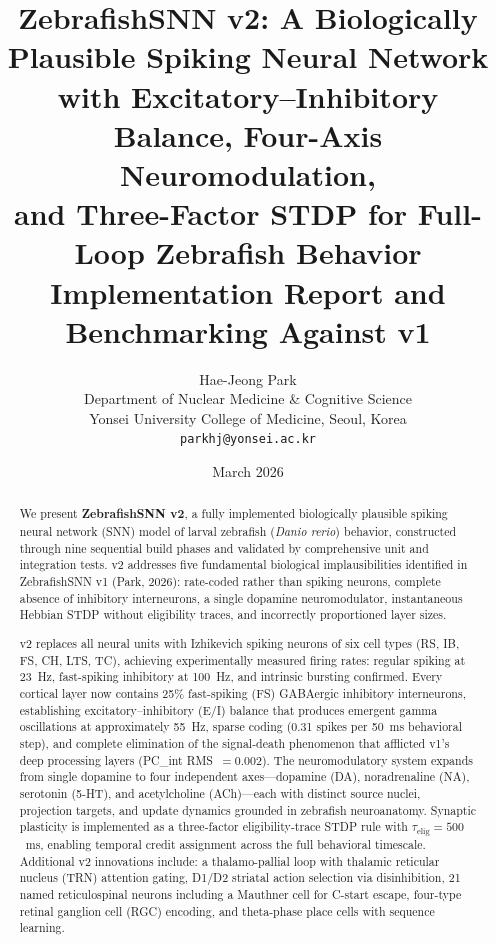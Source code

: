 \documentclass[11pt,a4paper]{article}
\title{%
  \textbf{ZebrafishSNN v2: A Biologically Plausible Spiking Neural Network\\
  with Excitatory--Inhibitory Balance, Four-Axis Neuromodulation,\\
  and Three-Factor STDP for Full-Loop Zebrafish Behavior}\\[10pt]
  \large Implementation Report and Benchmarking Against v1
}
\author{%
  Hae-Jeong Park\\[4pt]
  Department of Nuclear Medicine \& Cognitive Science\\
  Yonsei University College of Medicine, Seoul, Korea\\
  \texttt{parkhj@yonsei.ac.kr}
}
\date{March 2026}
\begin{document}
\maketitle

\begin{abstract}

We present \textbf{ZebrafishSNN v2}, a fully implemented biologically plausible
spiking neural network (SNN) model of larval zebrafish (\textit{Danio rerio})
behavior, constructed through nine sequential build phases and validated by
comprehensive unit and integration tests.
v2 addresses five fundamental biological implausibilities identified in
ZebrafishSNN v1 (Park, 2026): rate-coded rather than spiking neurons,
complete absence of inhibitory interneurons, a single dopamine neuromodulator,
instantaneous Hebbian STDP without eligibility traces, and incorrectly
proportioned layer sizes.

v2 replaces all neural units with Izhikevich spiking neurons of six
cell types (RS, IB, FS, CH, LTS, TC), achieving experimentally measured
firing rates: regular spiking at 23~Hz, fast-spiking inhibitory at 100~Hz,
and intrinsic bursting confirmed.
Every cortical layer now contains 25\% fast-spiking (FS) GABAergic
inhibitory interneurons, establishing excitatory--inhibitory (E/I) balance
that produces emergent gamma oscillations at approximately 55~Hz,
sparse coding (0.31 spikes per 50~ms behavioral step), and complete
elimination of the signal-death phenomenon that afflicted v1's deep
processing layers (PC\_int RMS~$= 0.002$).
The neuromodulatory system expands from single dopamine to four independent
axes---dopamine (DA), noradrenaline (NA), serotonin (5-HT), and acetylcholine
(ACh)---each with distinct source nuclei, projection targets, and update
dynamics grounded in zebrafish neuroanatomy.
Synaptic plasticity is implemented as a three-factor eligibility-trace
STDP rule with $\tau_\mathrm{elig} = 500$~ms, enabling temporal credit
assignment across the full behavioral timescale.
Additional v2 innovations include: a thalamo-pallial loop with thalamic
reticular nucleus (TRN) attention gating, D1/D2 striatal action selection
via disinhibition, 21 named reticulospinal neurons including a Mauthner
cell for C-start escape, four-type retinal ganglion cell (RGC) encoding,
and theta-phase place cells with sequence learning.


\end{abstract}
\end{document}
